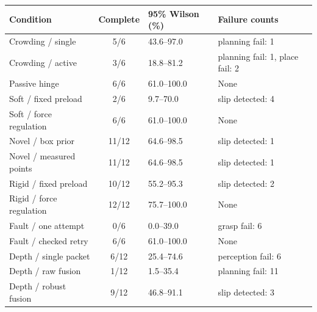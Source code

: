 \begin{tabularx}{\linewidth}{@{}p{45mm}cp{25mm}Y@{}}
\toprule Condition & Complete & 95\% Wilson (\%) & Failure counts \\
\midrule
Crowding / single & 5/6 & 43.6--97.0 & planning fail: 1 \\
Crowding / active & 3/6 & 18.8--81.2 & planning fail: 1, place fail: 2 \\
Passive hinge & 6/6 & 61.0--100.0 & None \\
Soft / fixed preload & 2/6 & 9.7--70.0 & slip detected: 4 \\
Soft / force regulation & 6/6 & 61.0--100.0 & None \\
Novel / box prior & 11/12 & 64.6--98.5 & slip detected: 1 \\
Novel / measured points & 11/12 & 64.6--98.5 & slip detected: 1 \\
Rigid / fixed preload & 10/12 & 55.2--95.3 & slip detected: 2 \\
Rigid / force regulation & 12/12 & 75.7--100.0 & None \\
Fault / one attempt & 0/6 & 0.0--39.0 & grasp fail: 6 \\
Fault / checked retry & 6/6 & 61.0--100.0 & None \\
Depth / single packet & 6/12 & 25.4--74.6 & perception fail: 6 \\
Depth / raw fusion & 1/12 & 1.5--35.4 & planning fail: 11 \\
Depth / robust fusion & 9/12 & 46.8--91.1 & slip detected: 3 \\
\bottomrule
\end{tabularx}
